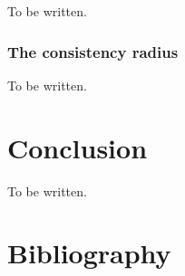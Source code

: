 \documentclass[]             %
{NASA}                       %
\theoremstyle{definition}
\begin{document}
To be written.

\hypertarget{the-consistency-radius}{%
  \subsubsection{The consistency radius}\label{the-consistency-radius}}

To be written.

\hypertarget{conclusion}{%
  \section{Conclusion}\label{conclusion}}

\label{sec:conclusion}

To be written.

\section*{Bibliography}\label{bibliography}



\end{document}
